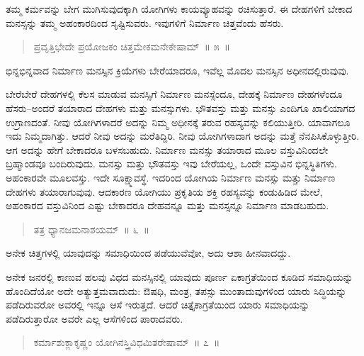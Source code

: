 ತಮ್ಮ ಕರ್ಮವನ್ನು ಬೇಗ ಮುಗಿಸುವುದಕ್ಕಾಗಿ ಯೋಗಿಗಳು ಕಾಯವ್ಯೂಹವನ್ನು ರಚಿಸುತ್ತಾರೆ. ಈ ದೇಹಗಳಿಗೆ ಬೇಕಾದ ಮನಸ್ಸನ್ನು ತಮ್ಮ ಅಹಂಕಾರದಿಂದ ಸೃಷ್ಟಿಸುವರು. ಇವುಗಳಿಗೆ ನಿರ್ಮಾಣ ಚಿತ್ತವೆಂದು ಹೆಸರು. 

\vspace{-0.3cm}

\begin{verse}
ಪ್ರವೃತ್ತಿಭೇದೇ ಪ್ರಯೋಜಕಂ ಚಿತ್ತಮೇಕಮನೇಕೇಷಾಮ್​~॥ ೫~॥
\end{verse}

\vspace{-0.3cm}

ಭಿನ್ನಭಿನ್ನವಾದ ನಿರ್ಮಾಣ ಮನಸ್ಸಿನ ಕ್ರಿಯೆಗಳು ಬೇರೆಯಾದರೂ, ಇವೆಲ್ಲ ಮೊದಲ ಮನಸ್ಸಿನ ಅಧೀನದಲ್ಲಿರುವುವು. 

ಬೇರೆಬೇರೆ ದೇಹಗಳಲ್ಲಿ ಕೆಲಸ ಮಾಡುವ ಮನಸ್ಸಿಗೆ ನಿರ್ಮಾಣ ಮನಸ್ಸೆಂದೂ, ದೇಹಕ್ಕೆ ನಿರ್ಮಾಣ ದೇಹಗಳೆಂದೂ ಹೆಸರು–ಅಂದರೆ ತಯಾರಾದ ದೇಹಗಳು ಮತ್ತು ಮನಸ್ಸುಗಳು. ಭೌತವಸ್ತು ಮತ್ತು ಮನಸ್ಸು ಎಂದಿಗೂ ಖಾಲಿಯಾಗದ ಉಗ್ರಾಣದಂತೆ. ನೀವು ಯೋಗಿಗಳಾದರೆ ಅದನ್ನು ನಿಮ್ಮ ಅಧೀನಕ್ಕೆ ತರುವ ರಹಸ್ಯವನ್ನು ಕಲಿಯುತ್ತೀರಿ. ಯಾವಾಗಲೂ ಇದು ನಿಮ್ಮದಾಗಿತ್ತು. ಆದರೆ ನೀವು ಅದನ್ನು ಮರೆತಿದ್ದಿರಿ. ನೀವು ಯೋಗಿಗಳಾದಾಗ ಅದನ್ನು ಮತ್ತೆ ನೆನಪಿಸಿಕೊಳ್ಳುತ್ತೀರಿ. ಆಗ ಅದನ್ನು ಹೇಗೆ ಬೇಕಾದರೂ ಬಳಸಬಹುದು. ನಿರ್ಮಾಣ ಮನಸ್ಸು ತಯಾರಾದ ಮೂಲ ವಸ್ತುವಿನಿಂದಲೇ ಬ್ರಹ್ಮಾಂಡವೂ  ಬಂದಿರುವುದು. ಮನಸ್ಸು ಮತ್ತು ಭೌತವಸ್ತು ಇವು ಬೇರೆಯಲ್ಲ, ಒಂದೇ ವಸ್ತುವಿನ ಭಿನ್ನಸ್ಥಿತಿಗಳು. ಅಹಂಕಾರವೇ ಮೂಲವಸ್ತು. ಇದೇ ಸೂಕ್ಷ್ಮಾವಸ್ಥೆ. ಇದರಿಂದ ಯೋಗಿಯ ನಿರ್ಮಾಣ ಮನಸ್ಸು ಮತ್ತು ನಿರ್ಮಾಣ ದೇಹಗಳು ತಯಾರಾಗುವುವು. ಆದಕಾರಣ ಯೋಗಿಯು ಪ್ರಕೃತಿಯ ಶಕ್ತಿ ರಹಸ್ಯವನ್ನು ಕಂಡುಹಿಡಿದ ಮೇಲೆ, ಅಹಂಕಾರದ ವಸ್ತುವಿನಿಂದ ಎಷ್ಟು ಬೇಕಾದರೂ ದೇಹವನ್ನೂ ಮತ್ತು ಮನಸ್ಸನ್ನೂ ನಿರ್ಮಾಣ ಮಾಡಬಹುದು. 

\vspace{-0.3cm}

\begin{verse}
ತತ್ರ ಧ್ಯಾನಜಮನಾಶಯಮ್​~॥ ೬~॥
\end{verse}

\vspace{-0.3cm}

ಅನೇಕ ಚಿತ್ತಗಳಲ್ಲಿ ಯಾವುದನ್ನು ಸಮಾಧಿಯಿಂದ ಪಡೆಯುವೆವೋ, ಅದು ಆಶಾ ಹೀನವಾದದ್ದು. 

ಅನೇಕ ಜನರಲ್ಲಿ ಕಾಣುವ ಹಲವು ವಿಧದ ಮನಸ್ಸಿನಲ್ಲಿ ಯಾವುದು ಪೂರ್ಣ ಏಕಾಗ್ರತೆಯಿಂದ ಕೂಡಿದ ಸಮಾಧಿಯನ್ನು ಹೊಂದಿದೆಯೋ ಅದೇ ಅತ್ಯುತ್ತಮವಾದುದು: ಔಷಧಿ, ಮಂತ್ರ, ತಪಸ್ಸು ಮುಂತಾದುವುಗಳಿಂದ ಯಾರು ಸಿದ್ಧಿಯನ್ನು ಪಡೆದಿರುವರೋ ಅವರಲ್ಲಿ ಇನ್ನೂ ಆಸೆ ಇರುತ್ತದೆ. ಆದರೆ ಚಿತ್ತೈಕಾಗ್ರತೆಯಿಂದ ಯಾರು ಸಮಾಧಿಯನ್ನು ಪಡೆದಿರುತ್ತಾರೋ ಅವರೇ ಎಲ್ಲ ಆಸೆಗಳಿಂದ ಪಾರಾದವರು. 

\vspace{-0.3cm}

\begin{verse}
ಕರ್ಮಾಶುಕ್ಲಾಕೃಷ್ಣಂ ಯೋಗಿನಸ್ತ್ರಿವಿಧಮಿತರೇಷಾಮ್​~॥ ೭~॥
\end{verse}

